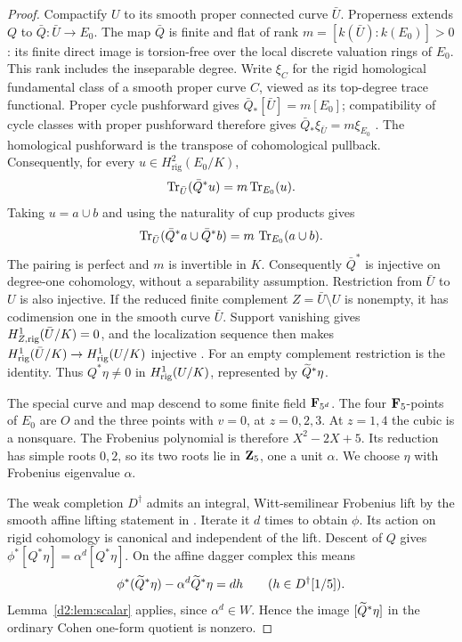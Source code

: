 \begin{proof}
Compactify \(U\) to its smooth proper connected curve \(\bar U\).
Properness extends \(Q\) to
\(\bar Q\colon\bar U\to E_0\).
The map \(\bar Q\) is finite and flat of rank
\(m=[k(\bar U):k(E_0)]>0\): its finite direct image is
torsion-free over the local discrete valuation rings of \(E_0\).
This rank includes the inseparable degree.
Write \(\xi_C\) for the rigid homological fundamental class of a
smooth proper curve \(C\), viewed as its top-degree trace functional.
Proper cycle pushforward gives
\(\bar Q_*[\bar U]=m[E_0]\); compatibility of cycle classes with
proper pushforward therefore gives
\(\bar Q_*\xi_{\bar U}=m\xi_{E_0}\)
\cite[Proposition~2.2, Section~2.1, and Proposition~6.4]{Petrequin2003}.
The homological pushforward is the transpose of cohomological
pullback. Consequently, for every
\(u\in H^2_{\mathrm{rig}}(E_0/K)\),
\[
 \operatorname{Tr}_{\bar U}(\bar Q^*u)=m\operatorname{Tr}_{E_0}(u).
\]
Taking \(u=a\cup b\) and using the naturality of cup products gives
\[
 \operatorname{Tr}_{\bar U}(\bar Q^*a\cup\bar Q^*b)
   =m\,\operatorname{Tr}_{E_0}(a\cup b).
\]
The pairing is perfect and \(m\) is invertible in \(K\).
Consequently \(\bar Q^*\) is injective on degree-one cohomology,
without a separability assumption.
Restriction from \(\bar U\) to \(U\) is also injective.
If the reduced finite complement \(Z=\bar U\setminus U\) is
nonempty, it has codimension one in the smooth curve \(\bar U\).
Support vanishing gives \(H^1_{Z,\mathrm{rig}}(\bar U/K)=0\), and
the localization sequence then makes
\(H^1_{\mathrm{rig}}(\bar U/K)\to H^1_{\mathrm{rig}}(U/K)\) injective
\cite[Theorem~1.1, third assertion, and Proposition~1.3,
pp.~63--64]{Petrequin2003}.
For an empty complement restriction is the identity.
Thus \(Q^*\eta\ne0\) in \(H^1_{\mathrm{rig}}(U/K)\), represented
by \(\widetilde Q^*\eta\).

The special curve and map descend to some finite field
\(\mathbf{F}_{5^d}\).
The four \(\mathbf{F}_5\)-points of \(E_0\) are \(O\) and the three
points with \(v=0\), at \(z=0,2,3\).
At \(z=1,4\) the cubic is a nonsquare.
The Frobenius polynomial is therefore \(X^2-2X+5\).
Its reduction has simple roots \(0,2\), so its two roots lie in
\(\mathbf{Z}_5\), one a unit \(\alpha\).
We choose \(\eta\) with Frobenius eigenvalue \(\alpha\).

The weak completion \(D^\dagger\) admits an integral, Witt-semilinear
Frobenius lift by the smooth affine lifting statement in
\cite[Introduction, p.~198]{DLZ2011}.
Iterate it \(d\) times to obtain \(\phi\).
Its action on rigid cohomology is canonical and independent of the
lift.
Descent of \(Q\) gives
\(\phi^*[Q^*\eta]=\alpha^d[Q^*\eta]\).
On the affine dagger complex this means
\[
 \phi^*(\widetilde Q^*\eta)-\alpha^d\widetilde Q^*\eta=dh
 \qquad(h\in D^\dagger[1/5]).
\]
Lemma~\ref{d2:lem:scalar} applies, since \(\alpha^d\in W\).
Hence the image \([\widetilde Q^*\eta]\) in the ordinary Cohen one-form
quotient is nonzero.


\end{proof}
